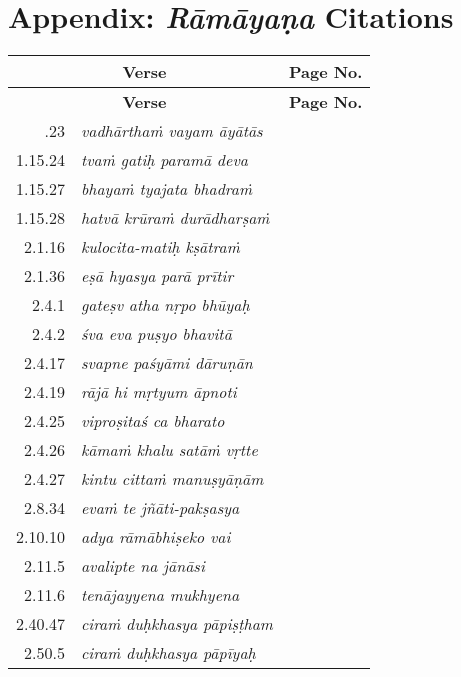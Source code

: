 \chapter*{Appendix: {\sl\bfseries Rāmāyaṇa} Citations}\label{rc}


{\renewcommand{\arraystretch}{1.2}
\begin{longtable}{rlc}
\hline
\multicolumn{2}{c}{\bf Verse} & {\bf Page No.}\\
\hline
\endfirsthead
\hline
\multicolumn{2}{c}{\bf Verse} & {\bf Page No.}\\
\hline
\endhead
\hline
\endfoot
\hline
\endlastfoot
1.15.23 & {\sl vadhārthaṁ vayam āyātās} & \pageref{verse1}\\
1.15.24 & {\sl tvaṁ gatiḥ paramā deva} & \pageref{verse2}\\
1.15.27 & {\sl bhayaṁ tyajata bhadraṁ} & \pageref{verse3}\\
1.15.28 & {\sl hatvā krūraṁ durādharṣaṁ} & \pageref{verse4}\\
2.1.16 & {\sl kulocita-matiḥ kṣātraṁ} & \pageref{verse5}\\
2.1.36 & {\sl eṣā hyasya parā prītir} & \pageref{verse6}\\
2.4.1 & {\sl gateṣv atha nṛpo bhūyaḥ} & \pageref{verse7}\\
2.4.2 & {\sl śva eva puṣyo bhavitā} & \pageref{verse8}\\
2.4.17 & {\sl svapne paśyāmi dāruṇān} & \pageref{verse9}\\
2.4.19 & {\sl rājā hi mṛtyum āpnoti} & \pageref{verse10}\\
2.4.25 & {\sl viproṣitaś ca bharato} & \pageref{verse11}\\
2.4.26 & {\sl kāmaṁ khalu satāṁ vṛtte} & \pageref{verse12}\\
2.4.27 & {\sl kintu cittaṁ manuṣyāṇām} & \pageref{verse13}\\
2.8.34 & {\sl evaṁ te jñāti-pakṣasya} & \pageref{verse14}\\
2.10.10 & {\sl adya rāmābhiṣeko vai} & \pageref{verse15}\\
2.11.5 & {\sl avalipte na jānāsi} & \pageref{verse16}\\
2.11.6 & {\sl tenājayyena mukhyena} & \pageref{verse17}\\
2.40.47 & {\sl ciraṁ duḥkhasya pāpiṣṭham} & \pageref{verse18}\\ 
2.50.5 & {\sl ciraṁ duḥkhasya pāpīyaḥ} & \pageref{verse19}\\

\end{longtable}}
